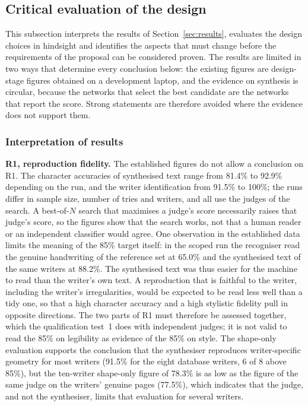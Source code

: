 \label{sec:discussion}

\subsection{Critical evaluation of the design} %
\label{sec:dis-critical}

This subsection interprets the results of Section~\ref{sec:results}, evaluates the design choices in hindsight and identifies the aspects that must change before the requirements of the proposal can be considered proven.
The results are limited in two ways that determine every conclusion below: the existing figures are design-stage figures obtained on a development laptop, and the evidence on synthesis is circular, because the networks that select the best candidate are the networks that report the score.
Strong statements are therefore avoided where the evidence does not support them.

    \subsubsection{Interpretation of results}
    \label{sec:dis-interp}

        \textbf{R1, reproduction fidelity.}
        The established figures do not allow a conclusion on R1.
        The character accuracies of synthesised text range from 81.4\% to 92.9\% depending on the run, and the writer identification from 91.5\% to 100\%; the runs differ in sample size, number of tries and writers, and all use the judges of the search.
        A best-of-$N$ search that maximises a judge's score necessarily raises that judge's score, so the figures show that the search works, not that a human reader or an independent classifier would agree.
        One observation in the established data limits the meaning of the 85\% target itself: in the scoped run the recogniser read the genuine handwriting of the reference set at 65.0\% and the synthesised text of the same writers at 88.2\%.
        The synthesised text was thus easier for the machine to read than the writer's own text.
        A reproduction that is faithful to the writer, including the writer's irregularities, would be expected to be read less well than a tidy one, so that a high character accuracy and a high stylistic fidelity pull in opposite directions.
        The two parts of R1 must therefore be assessed together, which the qualification test~1 does with independent judges; it is not valid to read the 85\% on legibility as evidence of the 85\% on style.
        The shape-only evaluation supports the conclusion that the synthesiser reproduces writer-specific geometry for most writers (91.5\% for the eight database writers, 6 of 8 above 85\%), but the ten-writer shape-only figure of 78.3\% is as low as the figure of the same judge on the writers' genuine pages (77.5\%), which indicates that the judge, and not the synthesiser, limits that evaluation for several writers.

